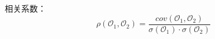 \documentclass[12pt, onecolumn]{article}
\begin{document}
	相关系数：
	\begin{equation*}
	\rho\left(\mathcal{O}_1,\mathcal{O}_2 \right)=\frac{cov\left(\mathcal{O}_1,\mathcal{O}_2 \right) }{
	\sigma\left(\mathcal{O}_1\right) \cdot\sigma\left(\mathcal{O}_2 \right) 	
	}
	\end{equation*}
	
	
	
	
	
	
	
	
	
	
	
	
	
	
	
	
	
	
	
	
	
	
	
	
	
	
	
	
	
	
	
	
	
	
	
	
	
	
	
	
	
	
	
	
	
	
	
	
	
	
	
	
	
	
	
	
	
	
	
	
	
	
	
	
	
	
\end{document}
